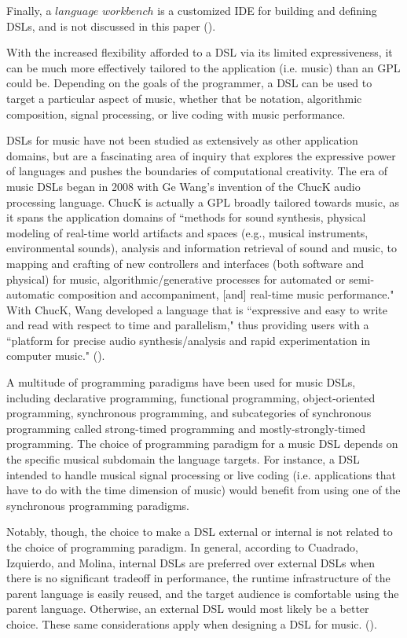 \documentclass{report}
\newcommand\citeparen[1]{(\cite{#1})}
\begin{document}
Finally, a $ language$ $workbench$ is a customized IDE for building and defining DSLs, and is not discussed in this paper \citeparen{fowler_parsons_2011}. 

With the increased flexibility afforded to  a DSL via its limited expressiveness, it can be much  more effectively tailored to the application (i.e. music) than an GPL could be. Depending on the goals of the programmer, a DSL can be used to target a particular aspect of music, whether that be notation, algorithmic composition, signal processing, or live coding with music performance. 

DSLs for music have not been studied as extensively as other application domains, but are a fascinating area of inquiry that explores the expressive power of languages and pushes the boundaries of computational creativity. The era of music DSLs began in 2008  with Ge Wang's invention of the ChucK audio processing language. ChucK is actually a GPL broadly tailored towards music, as it spans the application domains of ``methods for sound synthesis, physical modeling of real-time world artifacts and spaces (e.g.,
musical instruments, environmental sounds), analysis and information retrieval of sound and music, to mapping and crafting of new controllers and interfaces (both software and physical) for music, algorithmic/generative processes for automated or semi-automatic composition and accompaniment, [and] real-time music performance." With ChucK, Wang developed a language that is ``expressive and easy to write and read with respect to time and parallelism," thus providing users with a ``platform for precise audio synthesis/analysis and rapid experimentation in computer music." \citeparen{wang_2008}. 

A multitude of programming paradigms have been used for music DSLs, including declarative programming, functional programming, object-oriented programming, synchronous programming, and subcategories of synchronous programming called strong-timed programming and mostly-strongly-timed programming. The choice of programming paradigm for a music DSL depends on the specific musical subdomain the language targets. For instance, a DSL intended to handle musical signal processing or live coding (i.e. applications that have to do with the time dimension of music) would benefit from using one of the synchronous programming paradigms. 

Notably, though, the choice to make a DSL external or internal is not related to the choice of programming paradigm. In general, according to Cuadrado, Izquierdo, and Molina, internal DSLs are preferred over external DSLs when there  is  no significant tradeoff in performance, the runtime infrastructure of the parent language is easily reused, and the target audience is comfortable using  the parent language. Otherwise, an external DSL would most likely be a better choice. These same considerations apply when designing a DSL for music.
\citeparen{cuadrado_izquierdo_molina_2012}.
\end{document}
